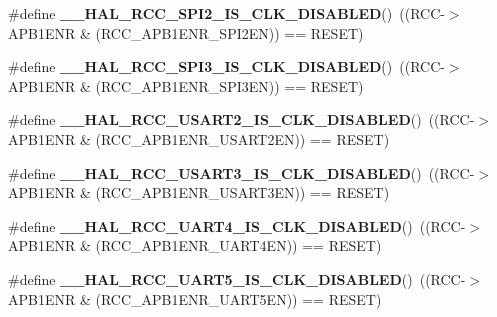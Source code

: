 \begin{DoxyCompactItemize}
\#define {\bfseries \+\_\+\+\_\+\+H\+A\+L\+\_\+\+R\+C\+C\+\_\+\+S\+P\+I2\+\_\+\+I\+S\+\_\+\+C\+L\+K\+\_\+\+D\+I\+S\+A\+B\+L\+ED}()~((R\+CC-\/$>$A\+P\+B1\+E\+NR \& (R\+C\+C\+\_\+\+A\+P\+B1\+E\+N\+R\+\_\+\+S\+P\+I2\+EN)) == R\+E\+S\+ET)
\item 
\mbox{\label{group___r_c_c_ex___peripheral___clock___enable___disable___status_ga625e04cf32d6c74d418ba29368f680d4}} 
\#define {\bfseries \+\_\+\+\_\+\+H\+A\+L\+\_\+\+R\+C\+C\+\_\+\+S\+P\+I3\+\_\+\+I\+S\+\_\+\+C\+L\+K\+\_\+\+D\+I\+S\+A\+B\+L\+ED}()~((R\+CC-\/$>$A\+P\+B1\+E\+NR \& (R\+C\+C\+\_\+\+A\+P\+B1\+E\+N\+R\+\_\+\+S\+P\+I3\+EN)) == R\+E\+S\+ET)
\item 
\mbox{\label{group___r_c_c_ex___peripheral___clock___enable___disable___status_ga61e4b1f3e82831cdc7508d4c38312eab}} 
\#define {\bfseries \+\_\+\+\_\+\+H\+A\+L\+\_\+\+R\+C\+C\+\_\+\+U\+S\+A\+R\+T2\+\_\+\+I\+S\+\_\+\+C\+L\+K\+\_\+\+D\+I\+S\+A\+B\+L\+ED}()~((R\+CC-\/$>$A\+P\+B1\+E\+NR \& (R\+C\+C\+\_\+\+A\+P\+B1\+E\+N\+R\+\_\+\+U\+S\+A\+R\+T2\+EN)) == R\+E\+S\+ET)
\item 
\mbox{\label{group___r_c_c_ex___peripheral___clock___enable___disable___status_ga9c6b66352f998564a6492d3e5d6aa536}} 
\#define {\bfseries \+\_\+\+\_\+\+H\+A\+L\+\_\+\+R\+C\+C\+\_\+\+U\+S\+A\+R\+T3\+\_\+\+I\+S\+\_\+\+C\+L\+K\+\_\+\+D\+I\+S\+A\+B\+L\+ED}()~((R\+CC-\/$>$A\+P\+B1\+E\+NR \& (R\+C\+C\+\_\+\+A\+P\+B1\+E\+N\+R\+\_\+\+U\+S\+A\+R\+T3\+EN)) == R\+E\+S\+ET)
\item 
\mbox{\label{group___r_c_c_ex___peripheral___clock___enable___disable___status_ga1384af5e720a24c083a2154c22e60391}} 
\#define {\bfseries \+\_\+\+\_\+\+H\+A\+L\+\_\+\+R\+C\+C\+\_\+\+U\+A\+R\+T4\+\_\+\+I\+S\+\_\+\+C\+L\+K\+\_\+\+D\+I\+S\+A\+B\+L\+ED}()~((R\+CC-\/$>$A\+P\+B1\+E\+NR \& (R\+C\+C\+\_\+\+A\+P\+B1\+E\+N\+R\+\_\+\+U\+A\+R\+T4\+EN)) == R\+E\+S\+ET)
\item 
\mbox{\label{group___r_c_c_ex___peripheral___clock___enable___disable___status_ga1e5611011911ef745b5e9d2c8d3160f6}} 
\#define {\bfseries \+\_\+\+\_\+\+H\+A\+L\+\_\+\+R\+C\+C\+\_\+\+U\+A\+R\+T5\+\_\+\+I\+S\+\_\+\+C\+L\+K\+\_\+\+D\+I\+S\+A\+B\+L\+ED}()~((R\+CC-\/$>$A\+P\+B1\+E\+NR \& (R\+C\+C\+\_\+\+A\+P\+B1\+E\+N\+R\+\_\+\+U\+A\+R\+T5\+EN)) == R\+E\+S\+ET)

\end{DoxyCompactItemize}
